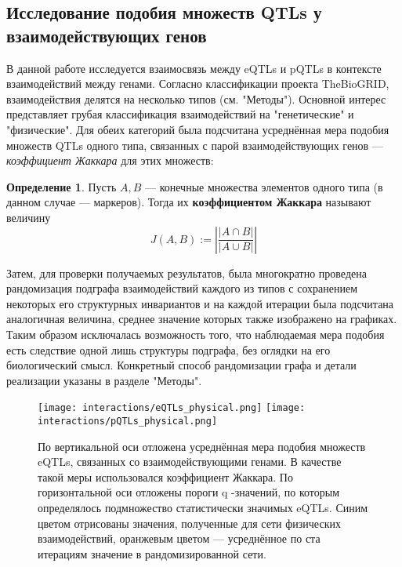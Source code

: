 \documentclass[11pt,a4paper]{report}
\theoremstyle{definition}
\theoremstyle{definition}
\theoremstyle{definition}
\newtheorem*{definition}{Определение}
\begin{document}
	\subsection{Исследование подобия множеств QTLs у взаимодействующих генов}
		В данной работе исследуется взаимосвязь между eQTLs и pQTLs в контексте взаимодействий между генами. Согласно классификации проекта TheBioGRID, взаимодействия делятся на несколько типов (см. "Методы"). Основной интерес представляет грубая классификация взаимодействий на "генетические" и "физические". Для обеих категорий была подсчитана усреднённая мера подобия множеств QTLs одного типа, связанных с парой взаимодействующих генов — \textit{коэффициент Жаккара} для этих множеств:
		
		\begin{definition}
			Пусть $ A, B $ — конечные множества элементов одного типа (в данном случае — маркеров). Тогда их \textbf{коэффициентом Жаккара} называют величину
			$$ J(A, B) := \left| \frac{|A \cap B|}{|A \cup B|} \right| $$
		\end{definition}
			
	 Затем, для проверки получаемых результатов, была многократно проведена рандомизация подграфа взаимодействий каждого из типов с сохранением некоторых его структурных инвариантов и на каждой итерации была подсчитана аналогичная величина, среднее значение которых также изображено на графиках. Таким образом исключалась возможность того, что наблюдаемая мера подобия есть следствие одной лишь структуры подграфа, без оглядки на его биологический смысл. Конкретный способ рандомизации графа и детали реализации указаны в разделе "Методы". 
		
		\begin{figure}[H]
				\caption{По вертикальной оси отложена усреднённая мера подобия множеств eQTLs, связанных со взаимодействующими генами. В качестве такой меры использовался коэффициент Жаккара. По горизонтальной оси отложены пороги q -значений, по которым определялось подмножество статистически значимых  eQTLs. Синим цветом отрисованы значения, полученные для сети физических взаимодействий, оранжевым цветом — усреднённое по ста итерациям значение в рандомизированной сети. }
				\texttt{[image: interactions/eQTLs\_physical.png]}
				\texttt{[image: interactions/pQTLs\_physical.png]}
		\end{figure}
		
\end{document}
